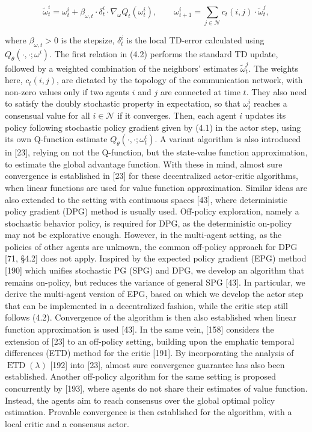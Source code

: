 \documentclass[10pt]{article}
\begin{document}
\[
\widetilde{\omega}_{t}^{i}=\omega_{t}^{i}+\beta_{\omega, t} \cdot \delta_{t}^{i} \cdot \nabla_{\omega} Q_{t}\left(\omega_{t}^{i}\right), \quad \quad \omega_{t+1}^{i}=\sum_{j \in \mathcal{N}} c_{t}(i, j) \cdot \widetilde{\omega}_{t}^{j},
\]

where $\beta_{\omega, t}>0$ is the stepsize, $\delta_{t}^{i}$ is the local TD-error calculated using $Q_{\theta}\left(\cdot, \cdot ; \omega^{i}\right)$. The first relation in (4.2) performs the standard TD update, followed by a weighted combination of the neighbors' estimates $\widetilde{\omega}_{t}^{j}$. The weights here, $c_{t}(i, j)$, are dictated by the topology of the communication network, with non-zero values only if two agents $i$ and $j$ are connected at time $t$. They also need to satisfy the doubly stochastic property in expectation, so that $\omega_{t}^{i}$ reaches a consensual value for all $i \in \mathcal{N}$ if it converges. Then, each agent $i$ updates its policy following stochastic policy gradient given by (4.1) in the actor step, using its own Q-function estimate $Q_{\theta}\left(\cdot, \cdot ; \omega_{t}^{i}\right)$. A variant algorithm is also introduced in [23], relying on not the Q-function, but the state-value function approximation, to estimate the global advantage function. With these in mind, almost sure convergence is established in [23] for these decentralized actor-critic algorithms, when linear functions are used for value function approximation. Similar ideas are also extended to the setting with continuous spaces [43], where deterministic policy gradient (DPG) method is usually used. Off-policy exploration, namely a stochastic behavior policy, is required for DPG, as the deterministic on-policy may not be explorative enough. However, in the multi-agent setting, as the policies of other agents are unknown, the common off-policy approach for DPG [71, §4.2] does not apply. Inspired by the expected policy gradient (EPG) method [190] which unifies stochastic PG (SPG) and DPG, we develop an algorithm that remains on-policy, but reduces the variance of general SPG [43]. In particular, we derive the multi-agent version of EPG, based on which we develop the actor step that can be implemented in a decentralized fashion, while the critic step still follows (4.2). Convergence of the algorithm is then also established when linear function approximation is used [43]. In the same vein, [158] considers the extension of [23] to an off-policy setting, building upon the emphatic temporal differences (ETD) method for the critic [191]. By incorporating the analysis of $\operatorname{ETD}(\lambda)$ [192] into [23], almost sure convergence guarantee has also been established. Another off-policy algorithm for the same setting is proposed concurrently by [193], where agents do not share their estimates of value function. Instead, the agents aim to reach consensus over the global optimal policy estimation. Provable convergence is then established for the algorithm, with a local critic and a consensus actor.
\end{document}
